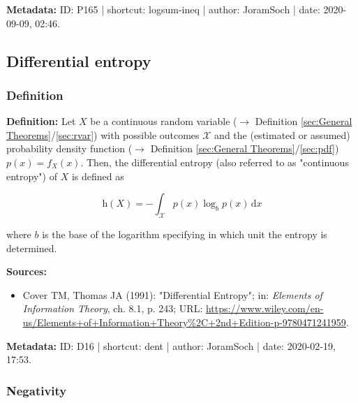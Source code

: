 \documentclass[a4paper,12pt,twoside]{book}
\begin{document}
\vspace{1em}
\textbf{Metadata:} ID: P165 | shortcut: logsum-ineq | author: JoramSoch | date: 2020-09-09, 02:46.
\vspace{1em}



\subsection{Differential entropy}

\subsubsection[\textit{Definition}]{Definition} \label{sec:dent}
\setcounter{equation}{0}

\textbf{Definition:} Let $X$ be a continuous random variable ($\rightarrow$ Definition \ref{sec:General Theorems}/\ref{sec:rvar}) with possible outcomes $\mathcal{X}$ and the (estimated or assumed) probability density function ($\rightarrow$ Definition \ref{sec:General Theorems}/\ref{sec:pdf}) $p(x) = f_X(x)$. Then, the differential entropy (also referred to as "continuous entropy") of $X$ is defined as

\begin{equation} \label{eq:dent-dent}
\mathrm{h}(X) = - \int_{\mathcal{X}} p(x) \log_b p(x) \, \mathrm{d}x
\end{equation}

where $b$ is the base of the logarithm specifying in which unit the entropy is determined.


\vspace{1em}
\textbf{Sources:}
\begin{itemize}
\item Cover TM, Thomas JA (1991): "Differential Entropy"; in: \textit{Elements of Information Theory}, ch. 8.1, p. 243; URL: \url{https://www.wiley.com/en-us/Elements+of+Information+Theory%2C+2nd+Edition-p-9780471241959}.
\end{itemize}


\vspace{1em}
\textbf{Metadata:} ID: D16 | shortcut: dent | author: JoramSoch | date: 2020-02-19, 17:53.
\vspace{1em}



\subsubsection[\textbf{Negativity}]{Negativity} \label{sec:dent-neg}
\setcounter{equation}{0}
\end{document}

